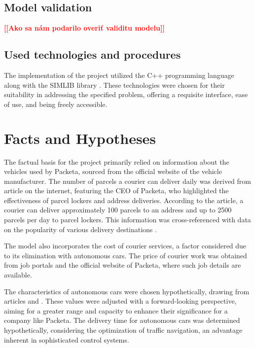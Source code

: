 \documentclass[a4paper, 11pt, a4paper]{article}
\newcommand{\todo}[1]{\textcolor{red}{\textbf{[[#1]]}}}
\begin{document}
\subsection{Model validation}

\noindent\todo{Ako sa nám podarilo overiť validitu modelu}


\subsection{Used technologies and procedures}

The implementation of the project utilized the C++ programming language along with the SIMLIB library \cite{SIMLIB}. 
These technologies were chosen for their suitability in addressing the specified problem, offering a requisite interface, 
ease of use, and being freely accessible.


\section{Facts and Hypotheses}

The factual basis for the project primarily relied on information about the vehicles used by Packeta, sourced from the official 
website of the vehicle manufacturer. The number of parcels a courier can deliver daily was derived from article \cite{parcels.num} on the internet, 
featuring the CEO of Packeta, who highlighted the effectiveness of parcel lockers and address deliveries. According to the article, 
a courier can deliver approximately 100 parcels to an address and up to 2500 parcels per day to parcel lockers. This information was 
cross-referenced with data on the popularity of various delivery destinations \cite{delivery.percentage}.

The model also incorporates the cost of courier services, a factor considered due to its elimination with autonomous cars. 
The price of courier work was obtained from job portals and the official website of Packeta, where such job details are available.

The characteristics of autonomous cars were chosen hypothetically, drawing from articles \cite{autonomous.emissions} and \cite{autonomous.models}. These values were adjusted with a 
forward-looking perspective, aiming for a greater range and capacity to enhance their significance for a company like Packeta. The delivery 
time for autonomous cars was determined hypothetically, considering the optimization of traffic navigation, an advantage inherent in sophisticated 
control systems.
\end{document}

